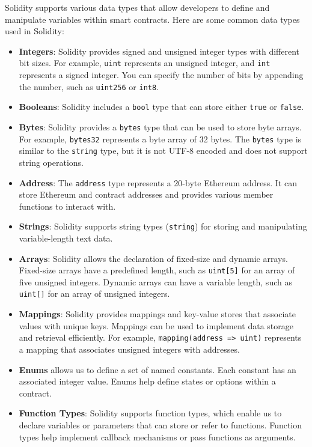 Solidity supports various data types that allow developers to define and manipulate variables within smart contracts. Here are some common data types used in Solidity:

\begin{itemize}
   \item \textbf{Integers}: Solidity provides signed and unsigned integer types with different bit sizes. For example, \texttt{uint} represents an unsigned integer, and \texttt{int} represents a signed integer. You can specify the number of bits by appending the number, such as \texttt{uint256} or \texttt{int8}.


   \item \textbf{Booleans}: Solidity includes a \texttt{bool} type that can store either \texttt{true} or \texttt{false}.


   \item \textbf{Bytes}: Solidity provides a \texttt{bytes} type that can be used to store byte arrays. For example, \texttt{bytes32} represents a byte array of 32 bytes. The \texttt{bytes} type is similar to the \texttt{string} type, but it is not UTF-8 encoded and does not support string operations.


   \item \textbf{Address}: The \texttt{address} type represents a 20-byte Ethereum address. It can store Ethereum and contract addresses and provides various member functions to interact with.


   \item \textbf{Strings}: Solidity supports string types (\texttt{string}) for storing and manipulating variable-length text data.


   \item \textbf{Arrays}: Solidity allows the declaration of fixed-size and dynamic arrays. Fixed-size arrays have a predefined length, such as \texttt{uint[5]} for an array of five unsigned integers. Dynamic arrays can have a variable length, such as \texttt{uint[]} for an array of unsigned integers.


   \item \textbf{Mappings}: Solidity provides mappings and key-value stores that associate values with unique keys. Mappings can be used to implement data storage and retrieval efficiently. For example, \texttt{mapping(address => uint)} represents a mapping that associates unsigned integers with addresses.


   \item \textbf{Enums} allows us to define a set of named constants. Each constant has an associated integer value. Enums help define states or options within a contract.


   \item \textbf{Function Types}: Solidity supports function types, which enable us to declare variables or parameters that can store or refer to functions. Function types help implement callback mechanisms or pass functions as arguments.


\end{itemize}

